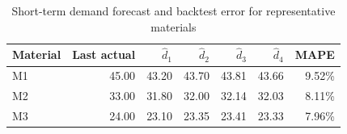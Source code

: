 \begin{table}[H]
\centering
\caption{Short-term demand forecast and backtest error for representative materials}
\label{tab:demo-v1-forecast-check}
\begin{tabular}{lrrrrrr}
\toprule
Material & Last actual & $\hat d_{1}$ & $\hat d_{2}$ & $\hat d_{3}$ & $\hat d_{4}$ & MAPE \\
\midrule
M1 & 45.00 & 43.20 & 43.70 & 43.81 & 43.66 & 9.52\% \\
M2 & 33.00 & 31.80 & 32.00 & 32.14 & 32.03 & 8.11\% \\
M3 & 24.00 & 23.10 & 23.35 & 23.41 & 23.33 & 7.96\% \\
\bottomrule
\end{tabular}
\end{table}
